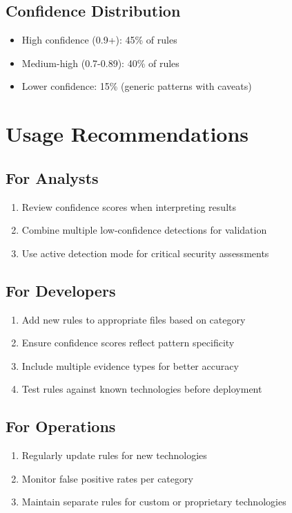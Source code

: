 \documentclass[11pt,a4paper,oneside]{article}
\begin{document}
\subsection{Confidence Distribution}
\begin{itemize}
    \item High confidence (0.9+): 45\% of rules
    \item Medium-high (0.7-0.89): 40\% of rules
    \item Lower confidence: 15\% (generic patterns with caveats)
\end{itemize}

\section{Usage Recommendations}

\subsection{For Analysts}
\begin{enumerate}
    \item Review confidence scores when interpreting results
    \item Combine multiple low-confidence detections for validation
    \item Use active detection mode for critical security assessments
\end{enumerate}

\subsection{For Developers}
\begin{enumerate}
    \item Add new rules to appropriate files based on category
    \item Ensure confidence scores reflect pattern specificity
    \item Include multiple evidence types for better accuracy
    \item Test rules against known technologies before deployment
\end{enumerate}

\subsection{For Operations}
\begin{enumerate}
    \item Regularly update rules for new technologies
    \item Monitor false positive rates per category
    \item Maintain separate rules for custom or proprietary technologies
\end{enumerate}
\end{document}
